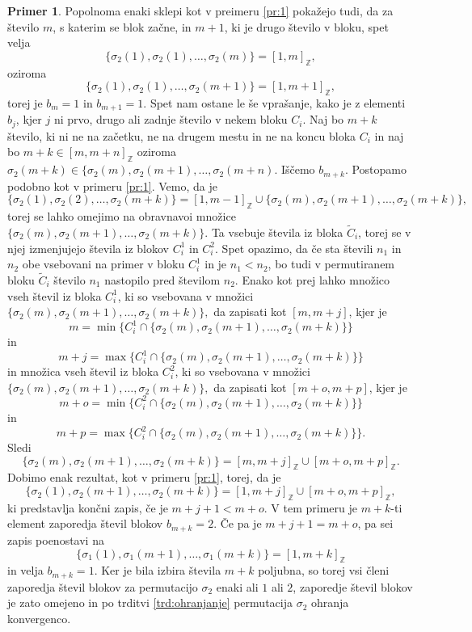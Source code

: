 \documentclass[12pt,a4paper,reqno]{amsart}
\theoremstyle{definition} %
\newtheorem{primer}[definicija]{Primer}
\theoremstyle{plain} %
\newcommand{\Z}{\mathbb Z}
\begin{document}
\begin{primer}
Popolnoma enaki sklepi kot v preimeru \ref{pr:1} pokažejo tudi, da za število $m$, s katerim se blok začne, in $m+1$, ki je drugo število v bloku, spet velja $$\{\sigma_2(1), \sigma_2(1), \ldots, \sigma_2(m) \}=[1,m]_{\Z},$$ oziroma $$\{\sigma_2(1), \sigma_2(1), \ldots, \sigma_2(m+1) \}=[1,m+1]_{\Z},$$ torej je $b_m=1$ in $b_{m+1}=1$.
Spet nam ostane le še vprašanje, kako je z elementi $b_j$, kjer $j$ ni prvo, drugo ali zadnje število v nekem bloku $C_i$. 
Naj bo $m+k$ število, ki ni ne na začetku, ne na drugem mestu in ne na koncu bloka $C_i$ in naj bo $m+k \in [m,m+n]_{\Z}$ oziroma $\sigma_2(m+k) \in \{\sigma_2(m), \sigma_2(m+1), \ldots, \sigma_2(m+n)$. Iščemo $b_{m+k}$. Postopamo podobno kot v primeru \ref{pr:1}. 
Vemo, da je $$\{ \sigma_2(1), \sigma_2(2), \ldots, \sigma_2(m+k) \}=[1,m-1]_{\Z}\cup \{ \sigma_2(m), \sigma_2(m+1), \ldots, \sigma_2(m+k) \},$$
torej se lahko omejimo na obravnavoi množice $\{ \sigma_2(m), \sigma_2(m+1), \ldots, \sigma_2(m+k) \}.$ Ta vsebuje števila iz bloka $\tilde{C}_i$, torej se v njej izmenjujejo števila iz blokov $C_i^1$ in $C_i^2$. Spet opazimo, da če sta števili $n_1$ in $n_2$ obe vsebovani na primer v bloku $C_i^1$ in je $n_1<n_2$, bo tudi v permutiranem bloku $\tilde{C}_i$ število $n_1$ nastopilo pred številom $n_2$.
Enako kot prej lahko množico vseh števil iz bloka $C_i^1$, ki so vsebovana v množici $\{ \sigma_2(m), \sigma_2(m+1), \ldots, \sigma_2(m+k) \},$ da zapisati kot $[m,m+j]$, kjer je $$m=\min \{C_i^1 \cap \{ \sigma_2(m), \sigma_2(m+1), \ldots, \sigma_2(m+k) \} \}$$
in $$m+j=\max \{C_i^1 \cap \{ \sigma_2(m), \sigma_2(m+1), \ldots, \sigma_2(m+k) \} \}$$
in množica vseh števil iz bloka $C_i^2$, ki so vsebovana v množici $\{ \sigma_2(m), \sigma_2(m+1), \ldots, \sigma_2(m+k) \},$ da zapisati kot $[m+o,m+p]$, kjer je $$m+o=\min \{C_i^2 \cap \{ \sigma_2(m), \sigma_2(m+1), \ldots, \sigma_2(m+k) \} \}$$
in $$m+p=\max \{C_i^2 \cap \{ \sigma_2(m), \sigma_2(m+1), \ldots, \sigma_2(m+k) \} \}.$$
Sledi $$\{ \sigma_2(m), \sigma_2(m+1), \ldots, \sigma_2(m+k) \}=[m,m+j]_{\Z} \cup [m+o,m+p]_{\Z}.$$
Dobimo enak rezultat, kot v primeru \ref{pr:1}, torej, da je $$\{ \sigma_2(1), \sigma_2(m+1), \ldots, \sigma_2(m+k) \}= [1,m+j]_{\Z} \cup [m+o,m+p]_{\Z},$$
ki predstavlja končni zapis, če je $m+j+1<m+o$. V tem primeru je $m+k$-ti element zaporedja števil blokov $b_{m+k}=2$. Če pa je $m+j+1=m+o$, pa sei zapis poenostavi na $$\{ \sigma_1(1), \sigma_1(m+1), \ldots, \sigma_1(m+k) \}=[1,m+k]_{\Z}$$
in velja $b_{m+k}=1$.
Ker je bila izbira števila $m+k$ poljubna, so torej vsi členi zaporedja števil blokov za permutacijo $\sigma_2$ enaki ali $1$ ali $2$, zaporedje števil blokov je zato omejeno in po trditvi \ref{trd:ohranjanje} permutacija $\sigma_2$ ohranja konvergenco.


\end{primer}
\end{document}
